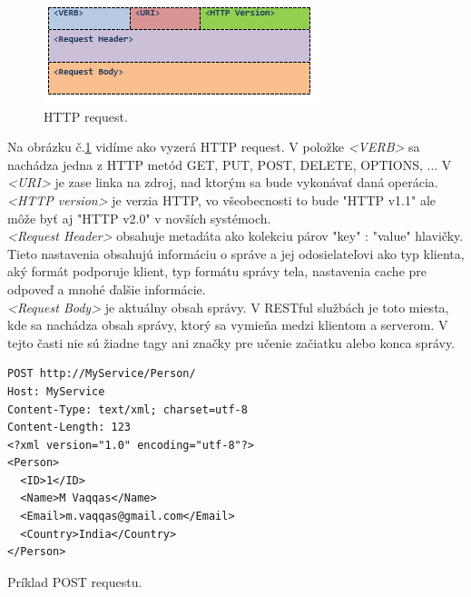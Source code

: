 \begin{figure}[H]
  \centering
  \includegraphics[scale=0.7]{img/rest/rest-http.png}
  \caption{HTTP request.}
  \label{rest-http}
\end{figure}

Na obrázku č.\ref{rest-http} vidíme ako vyzerá HTTP request. V položke \textit{<VERB>} sa nachádza jedna z HTTP metód GET, PUT, POST, DELETE, OPTIONS, ... V \textit{<URI>} je zase linka na zdroj, nad ktorým sa bude vykonávať daná operácia. \textit{<HTTP version>} je verzia HTTP, vo všeobecnosti to bude "HTTP v1.1" ale môže byť aj "HTTP v2.0" v novších systémoch.\\
\textit{<Request Header>} obsahuje metadáta ako kolekciu párov "key" : "value" hlavičky. Tieto nastavenia obsahujú informáciu o správe a jej odosielateľovi ako typ klienta, aký formát podporuje klient, typ formátu správy tela, nastavenia cache pre odpoveď a mnohé ďalšie informácie.\\
\textit{<Request Body>} je aktuálny obsah správy. V RESTful službách je toto miesta, kde sa nachádza obsah správy, ktorý sa vymieňa medzi klientom a serverom. V tejto časti nie sú žiadne tagy ani značky pre učenie začiatku alebo konca správy.\cite{rest-vaqqas}

\begin{algorithm}[H]
\begin{lstlisting}
POST http://MyService/Person/
Host: MyService
Content-Type: text/xml; charset=utf-8
Content-Length: 123
<?xml version="1.0" encoding="utf-8"?>
<Person>
  <ID>1</ID>
  <Name>M Vaqqas</Name>
  <Email>m.vaqqas@gmail.com</Email>
  <Country>India</Country>
</Person>
\end{lstlisting}
 \caption{Príklad POST requestu.}
 \label{post-request}
\end{algorithm}

